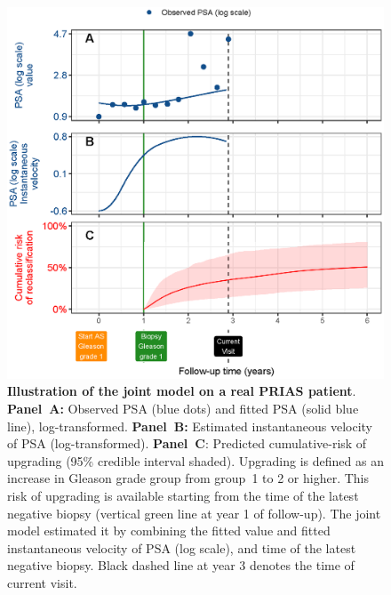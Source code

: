 \begin{figure}
\centerline{\includegraphics[width=\columnwidth]{images/jmExplanationPlot_113.eps}}
\caption{\textbf{Illustration of the joint model on a real PRIAS patient}. \textbf{Panel~A:} Observed PSA (blue dots) and fitted PSA (solid blue line), log-transformed. \textbf{Panel~B:} Estimated instantaneous velocity of PSA (log-transformed). \textbf{Panel~C}: Predicted cumulative-risk of upgrading (95\% credible interval shaded). Upgrading is defined as an increase in Gleason grade group from group~1 to 2 or higher. This risk of upgrading is available starting from the time of the latest negative biopsy (vertical green line at year 1 of follow-up). The joint model estimated it by combining the fitted value and fitted instantaneous velocity of PSA (log scale), and time of the latest negative biopsy. Black dashed line at year 3 denotes the time of current visit.}
\label{fig:jmExplanationPlot_113}
\end{figure}

